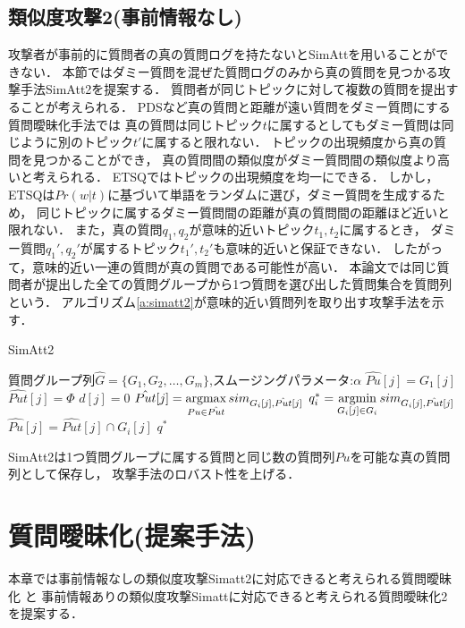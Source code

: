 \documentclass[master]{suribt}
\theoremstyle{definition}
\newcommand{\argmax}{\mathop{\rm argmax}\limits}
\newcommand{\argmin}{\mathop{\rm argmin}\limits}
\begin{document}
 \section{類似度攻撃2(事前情報なし)}
 攻撃者が事前的に質問者の真の質問ログを持たないとSimAttを用いることができない．
 本節ではダミー質問を混ぜた質問ログのみから真の質問を見つかる攻撃手法SimAtt2を提案する．
 質問者が同じトピックに対して複数の質問を提出することが考えられる．
 PDSなど真の質問と距離が遠い質問をダミー質問にする質問曖昧化手法では
 真の質問は同じトピック$t$に属するとしてもダミー質問は同じように別のトピック$t'$に属すると限れない．
 トピックの出現頻度から真の質問を見つかることができ，
 真の質問間の類似度がダミー質問間の類似度より高いと考えられる．
 ETSQではトピックの出現頻度を均一にできる．
 しかし，ETSQは$Pr(w|t)$に基づいて単語をランダムに選び，ダミー質問を生成するため，
 同じトピックに属するダミー質問間の距離が真の質問間の距離ほど近いと限れない．
 また，真の質問$q_1,q_2$が意味的近いトピック$t_1,t_2$に属するとき，
 ダミー質問$q_1',q_2'$が属するトピック$t_1',t_2'$も意味的近いと保証できない．
 したがって，意味的近い一連の質問が真の質問である可能性が高い．
 本論文では同じ質問者が提出した全ての質問グループから1つ質問を選び出した質問集合を質問列という．
 アルゴリズム\ref{a:simatt2}が意味的近い質問列を取り出す攻撃手法を示す．

 \begin{algorithm}
 \caption{SimAtt2}
 \begin{algorithmic}[1]
  \Require 質問グループ列$\hat{G}=\{ G_1,G_2, \dots , G_m\}$,スムージングパラメータ:$\alpha$
   \State $\hat{Pu}[j] = G_1[j]$
   \State $\hat{Put}[j] = \Phi$
   \State $d[j] = 0$
  \EndFor
   \State $\hat{Put}[j] = \argmax_{Pu \in \hat{Put}}sim_{G_i[j],\hat{Put}[j]}$
   \EndFor
   \State $q^*_i = \argmin_{G_i[j] \in G_i}sim_{G_i[j],\hat{Put}[j]}$
    \State $\hat{Pu}[j] = \hat{Put}[j] \cap G_i[j]$
   \EndFor
  \EndFor
  \Ensure $q^*$
 \end{algorithmic}
 \label{a:simatt2}
 \end{algorithm}
 
 SimAtt2は1つ質問グループに属する質問と同じ数の質問列$Pu$を可能な真の質問列として保存し，
 攻撃手法のロバスト性を上げる．


 \chapter{質問曖昧化(提案手法)}
 本章では事前情報なしの類似度攻撃Simatt2に対応できると考えられる質問曖昧化
 と
 事前情報ありの類似度攻撃Simattに対応できると考えられる質問曖昧化2
 を提案する．
 
\end{document}
